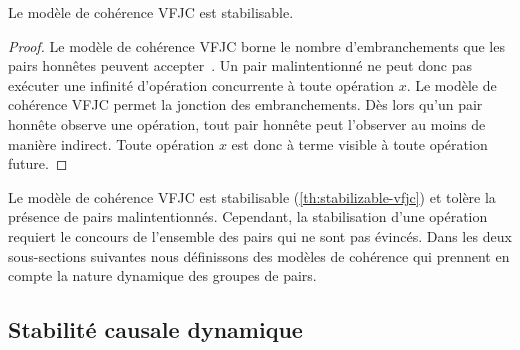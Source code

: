 

\begin{theorem}\label{th:stabilizable-vfjc}
Le modèle de cohérence \ac{VFJC} est stabilisable.
\end{theorem}

\begin{proof}
Le modèle de cohérence \ac{VFJC} borne le nombre d'embranchements que les pairs honnêtes peuvent accepter~\autocite{mahajan_2011_cac}.
Un pair malintentionné ne peut donc pas exécuter une infinité d'opération concurrente à toute opération $x$.
Le modèle de cohérence \ac{VFJC} permet la jonction des embranchements.
Dès lors qu'un pair honnête observe une opération, tout pair honnête peut l'observer au moins de manière indirect.
Toute opération $x$ est donc à terme visible à toute opération future.
\end{proof}

Le modèle de cohérence \ac{VFJC} est stabilisable (\autoref{th:stabilizable-vfjc}) et tolère la présence de pairs malintentionnés.
Cependant, la stabilisation d'une opération requiert le concours de l'ensemble des pairs qui ne sont pas évincés.
Dans les deux sous-sections suivantes nous définissons des modèles de cohérence qui prennent en compte la nature dynamique des groupes de pairs.


\subsection{Stabilité causale dynamique}\label{subsec:dcs}

